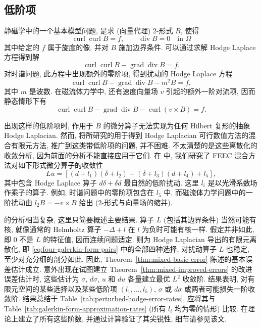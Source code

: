 \subsection{{低阶项}}\label{sec:lower-order-terms}

{静磁学中的一个基本模型问题, 是求 (向量代理) 2-形式 $B$, 使得}
\[
\operatorname{curl}\operatorname{curl}B=f,\qquad\operatorname{div}B=0\quad\text{in }\Omega
\]
{其中给定的 $f$ 属于旋度的像, 并对 $B$ 施加边界条件. 可以通过求解 Hodge Laplace 方程得到解}
\[
\operatorname{curl}\operatorname{curl}B-\operatorname{grad}\operatorname{div}B=f.
\]
{对时谐问题, 此方程中出现额外的零阶项, 得到扰动的 Hodge Laplace 方程}
\[
\operatorname{curl}\operatorname{curl}B-\operatorname{grad}\operatorname{div}B-m^2B=f,
\]
{其中 $m$ 是波数. 在磁流体力学中, 还有速度向量场 $v$ 引起的额外一阶对流项, 因而静态情形下有}
\[
\operatorname{curl}\operatorname{curl}B-\operatorname{grad}\operatorname{div}B-\operatorname{curl}(v\times B)=f.
\]

{出现这样的低阶项时, 作用于 $B$ 的微分算子无法实现为任何 Hilbert 复形的抽象 Hodge Laplacian. 然而, 将所研究的用于得到 Hodge Laplacian 可行数值方法的混合有限元方法, 推广到这类带低阶项的问题, 并不困难. 不太清楚的是这些离散化的收敛分析, 因为前面的分析不能直接应用于它们. 在  中, 我们研究了 FEEC 混合方法对如下形式微分算子的收敛性}
\[
Lu=[(d+l_1)(\delta+l_2)+(\delta+l_3)(d+l_4)+l_5],
\]
{其中包含 Hodge Laplace 算子 $d\delta+\delta d$ 最自然的低阶扰动. 这里 $l_i$ 是以光滑系数场作乘子的算子. 例如, 时谐问题中的零阶项包含在 $l_5$ 中, 而磁流体力学问题中的一阶扰动由 $l_2B=-v\times B$ 给出 (2-形式与向量场的缩并).}

{ 的分析相当复杂, 这里只简要概述主要结果. 算子 $L$ (包括其边界条件) 当然可能有核, 就像通常的 Helmholtz 算子 $-\Delta+l$ 在 $l$ 为负时可能有核一样. 假定并非如此, 即 $0$ 不是 $L$ 的特征值, 因而连续问题适定. 则为 Hodge Laplacian 导出的有限元离散化, 即 \eqref{eq:four-galerkin-form-pairs} 中的全部四种选择, 对扰动算子 $L$ 也稳定, 至少对充分细的剖分如此. 因此, Theorem~\ref{thm:mixed-basic-error} 陈述的基本误差估计成立. 意外出现在试图建立 Theorem~\ref{thm:mixed-improved-errors} 的改进误差估计时, 这些估计为 $\sigma$, $d\sigma$, $u$ 和 $du$ 各量建立最优 $L^2$ 收敛阶. 结果表明, 对有限元空间的某些选择以及某些低阶项 $(l_1,\ldots,l_5)$, $\sigma$ 或 $d\sigma$ 或两者可能损失一阶收敛阶. 结果总结于 Table~\ref{tab:perturbed-hodge-error-rates}, 应将其与 Table~\ref{tab:galerkin-form-approximation-rates} (所有 $l_i$ 均为零的情形) 比较.  在理论上建立了所有这些阶数, 并通过计算验证了其尖锐性, 细节请参见该文.}

